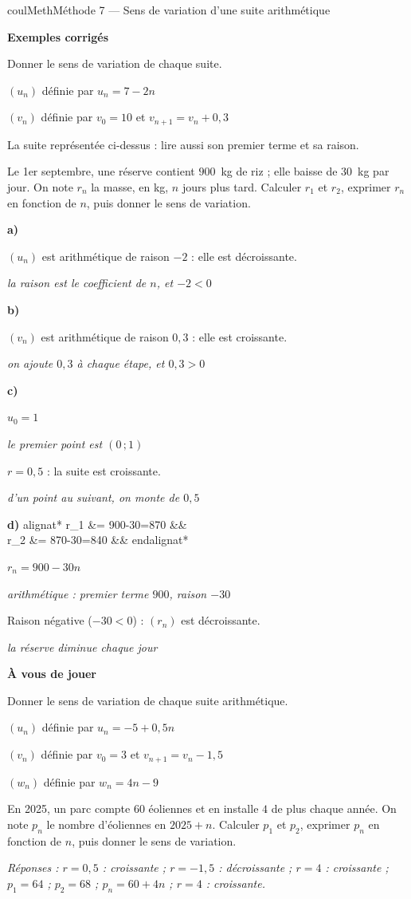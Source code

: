 \documentclass[11pt,a4paper]{article}
\makeatletter
\newlength{\retraitcalculs}
\newcounter{lycee@signet}
\newcommand{\signet}[3][]{\stepcounter{lycee@signet}%
  \edef\lycee@dest{\if\relax\detokenize{#1}\relax
    signet.\arabic{lycee@signet}\else#1\fi}%
  \hypertarget{\lycee@dest}{}\bookmark[level=#2,dest=\lycee@dest]{#3}}
\def\textsuperscript#1{#1}\def\dfrac#1#2{#1/#2}\def\frac#1#2{#1/#2}%
\newcommand{\res}[1]{#1}
\newcounter{methode}
\newenvironment{methodebox}[1][Méthode]{\stepcounter{methode}%
  \begin{boitecours}[phantom={\signet[methode-\arabic{methode}]{2}{#1}}]{coulMeth}{#1}}%
  {\end{boitecours}}
\newcommand{\etape}[1]{\par\smallskip\textbf{\color{coulMeth}#1}\par\nobreak\smallskip}
\newcommand{\reponse}[1]{\par\smallskip
  {\footnotesize\itshape\color{black!55}Réponses : #1}}
\newenvironment{calculs}{\setlength{\jot}{5pt}\@fleqntrue\@mathmargin\retraitcalculs
  \setlength{\abovedisplayskip}{4pt}\setlength{\belowdisplayskip}{4pt}%
  \setlength{\abovedisplayshortskip}{4pt}\setlength{\belowdisplayshortskip}{4pt}%
  \csname alignat*\endcsname{2}}%
  {\csname endalignat*\endcsname}
\newcommand{\rem}[1]{\text{\small\itshape\color{black!60}#1}}
\newcommand{\explique}[2]{\par\smallskip\noindent
  \begin{minipage}[t]{0.57\linewidth}\raggedright #1\end{minipage}\hfill
  \begin{minipage}[t]{0.40\linewidth}\raggedright\leavevmode
    {\small\itshape\color{black!60}#2}\end{minipage}\par}
\newcommand{\cas}[1]{\par\smallskip\noindent\textbf{\color{coulExo}#1}\vadjust{\nobreak}}
\newenvironment{correction}{\par}{\par}
\newcommand{\etapeexemples}{\etape{Exemples corrigés}}
\makeatother
\begin{document}
\begin{methodebox}[Méthode 7 --- Sens de variation d'une suite arithmétique]
\etapeexemples
Donner le sens de variation de chaque suite.
\begin{questions}[label=\alph*)]
  \item $(u_{n})$ définie par $u_{n}=7-2n$
  \item $(v_{n})$ définie par $v_{0}=10$ et $v_{n+1}=v_{n}+0{,}3$
  \item La suite représentée ci-dessus : lire aussi son premier terme et sa raison.
  \item Le 1\textsuperscript{er} septembre, une réserve contient $900$~kg de riz ; elle
        baisse de $30$~kg par jour. On note $r_{n}$ la masse, en kg, $n$ jours plus tard.
        Calculer $r_{1}$ et $r_{2}$, exprimer $r_{n}$ en fonction de $n$, puis donner le
        sens de variation.
\end{questions}
\begin{correction}
\cas{a)}
\explique{$(u_{n})$ est arithmétique de raison $-2$ : elle est \res{décroissante}.}{la
raison est le coefficient de $n$, et $-2<0$}
\cas{b)}
\explique{$(v_{n})$ est arithmétique de raison $0{,}3$ : elle est \res{croissante}.}{on
ajoute $0{,}3$ à chaque étape, et $0{,}3>0$}
\cas{c)}
\explique{$u_{0}=\res{1}$}{le premier point est $(0\,;1)$}
\explique{$r=\res{0{,}5}$ : la suite est \res{croissante}.}{d'un point au suivant, on monte de
$0{,}5$}
\cas{d)}
\begin{calculs}
r_{1} &= 900-30=\res{870} &\qquad& \rem{on retire $30$ chaque jour}\\
r_{2} &= 870-30=\res{840} &&
\end{calculs}
\explique{$r_{n}=\res{900-30n}$}{arithmétique : premier terme $900$, raison $-30$}
\explique{Raison négative ($-30<0$) : $(r_{n})$ est \res{décroissante}.}{la réserve diminue chaque
jour}
\end{correction}

\etape{À vous de jouer}
Donner le sens de variation de chaque suite arithmétique.
\begin{questions}[label=\alph*)]
  \item $(u_{n})$ définie par $u_{n}=-5+0{,}5n$
  \item $(v_{n})$ définie par $v_{0}=3$ et $v_{n+1}=v_{n}-1{,}5$
  \item $(w_{n})$ définie par $w_{n}=4n-9$
  \item En 2025, un parc compte $60$ éoliennes et en installe $4$ de plus chaque année. On
        note $p_{n}$ le nombre d'éoliennes en $2025+n$. Calculer $p_{1}$ et $p_{2}$,
        exprimer $p_{n}$ en fonction de $n$, puis donner le sens de variation.
\end{questions}
\reponse{$r=0{,}5$ : croissante ;\; $r=-1{,}5$ : décroissante ;\; $r=4$ : croissante ;\;
$p_{1}=64$ ; $p_{2}=68$ ; $p_{n}=60+4n$ ; $r=4$ : croissante.}
\end{methodebox}
\end{document}
